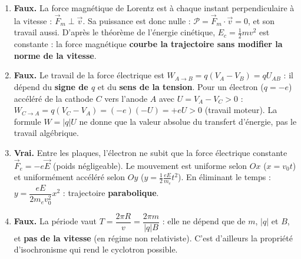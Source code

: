 \documentclass[11pt]{article}
\begin{document}
\begin{corrige}
\begin{enumerate}
\item \textbf{Faux.} La force magnétique de Lorentz est à chaque instant perpendiculaire à la vitesse : $\vec{F}_m \perp \vec{v}$. Sa puissance est donc nulle : $\mathcal{P} = \vec{F}_m\cdot\vec{v} = 0$, et son travail aussi. D'après le théorème de l'énergie cinétique, $E_c = \frac{1}{2}mv^2$ est constante : la force magnétique \textbf{courbe la trajectoire sans modifier la norme de la vitesse}.
\item \textbf{Faux.} Le travail de la force électrique est $W_{A\to B} = q(V_A - V_B) = qU_{AB}$ : il dépend du \textbf{signe de $q$} et du \textbf{sens de la tension}. Pour un électron ($q=-e$) accéléré de la cathode $C$ vers l'anode $A$ avec $U = V_A - V_C > 0$ : $W_{C\to A} = q(V_C - V_A) = (-e)(-U) = +eU > 0$ (travail moteur). La formule $W = |q|U$ ne donne que la valeur absolue du transfert d'énergie, pas le travail algébrique.
\item \textbf{Vrai.} Entre les plaques, l'électron ne subit que la force électrique constante $\vec{F}_e = -e\vec{E}$ (poids négligeable). Le mouvement est uniforme selon $Ox$ ($x = v_0 t$) et uniformément accéléré selon $Oy$ ($y = \frac{1}{2}\frac{eE}{m_e}t^2$). En éliminant le temps : $y = \dfrac{eE}{2m_e v_0^2}x^2$ : trajectoire \textbf{parabolique}.
\item \textbf{Faux.} La période vaut $T = \dfrac{2\pi R}{v} = \dfrac{2\pi m}{|q|B}$ : elle ne dépend que de $m$, $|q|$ et $B$, et \textbf{pas de la vitesse} (en régime non relativiste). C'est d'ailleurs la propriété d'isochronisme qui rend le cyclotron possible.
\end{enumerate}
\end{corrige}
\end{document}
